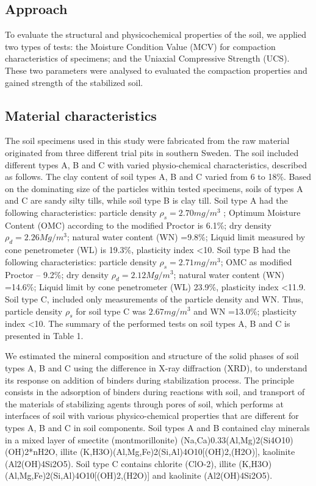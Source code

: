 \documentclass[electronics,article,submit,pdftex,moreauthors]{Definitions/mdpi}
\begin{document}
\subsection{Approach}

To evaluate the structural and physicochemical properties of the soil, we applied two types of tests: the Moisture Condition Value (MCV) for compaction characteristics of specimens; and the Uniaxial Compressive Strength (UCS). These two parameters were analysed to evaluated the compaction properties and gained strength of the stabilized soil.

\subsection{Material characteristics}
The soil specimens used in this study were fabricated from the raw material originated from three different trial pits in southern Sweden. The soil included different types A, B and C with varied physio-chemical characteristics, described as follows. The clay content of soil types A, B and C varied from 6 to 18\%. Based on the dominating size of the particles within tested specimens, soils of types A and C are sandy silty tills, while soil type B is clay till. Soil type A had the following characteristics: particle density $\rho _s =2.70 mg/m^3$ ; Optimum Moisture Content (OMC) according to the modified Proctor is 6.1\%; dry density $\rho _d = 2.26 Mg/m^3$; natural water content (WN) =9.8\%; Liquid limit measured by cone penetrometer (WL) is 19.3\%, plasticity index <10. Soil type B had the following characteristics: particle density $\rho _s = 2.71 mg/m^3$; OMC as modified Proctor – 9.2\%; dry density $\rho _d = 2.12 Mg/m^3$; natural water content (WN) =14.6\%; Liquid limit by cone penetrometer (WL) 23.9\%, plasticity index <11.9. Soil type C, included only measurements of the particle density and WN. Thus, particle density $\rho _s$ for soil type C was $2.67 mg/m^3$ and WN =13.0\%; plasticity index <10. The summary of the performed tests on soil types A, B and C is presented in Table 1. 

We estimated the mineral composition and structure of the solid phases of soil types A, B and C using the difference in X-ray diffraction (XRD), to understand its response on addition of binders during stabilization process. The principle consists in the adsorption of binders during reactions with soil, and transport of the materials of stabilizing agents through pores of soil, which performs at interfaces of soil with various physico-chemical properties that are different for types A, B and C in soil components. Soil types A and B contained clay minerals in a mixed layer of smectite (montmorillonite) (Na,Ca)0.33(Al,Mg)2(Si4O10)(OH)2*nH2O, illite (K,H3O)(Al,Mg,Fe)2(Si,Al)4O10[(OH)2,(H2O)], kaolinite (Al2(OH)4Si2O5). Soil type C contains chlorite (ClO-2), illite (K,H3O)(Al,Mg,Fe)2(Si,Al)4O10[(OH)2,(H2O)] and kaolinite (Al2(OH)4Si2O5). 
\end{document}
